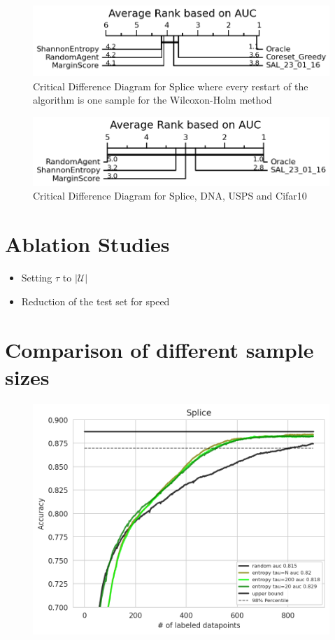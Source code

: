 \documentclass[]{article}
\begin{document}
\begin{figure}[H]
\centering
\includegraphics[width=0.8\linewidth]{img/eval_splice_embedded_cd}
\caption{Critical Difference Diagram for Splice where every restart of the algorithm is one sample for the Wilcoxon-Holm method}
\end{figure}
\begin{figure}[H]
\centering
\includegraphics[width=0.8\linewidth]{img/eval_macro}
\caption{Critical Difference Diagram for Splice, DNA, USPS and Cifar10}
\end{figure}



\section{Ablation Studies}
\begin{itemize}
	\item Setting $\tau$ to $|\mathcal{U}|$
	\item Reduction of the test set for speed
\end{itemize}



 

\appendix


\section{Comparison of different sample sizes}
\begin{figure}[H]
	\centering
	\includegraphics[width=0.7\linewidth]{img/tau_ablation.png}
\end{figure}
\end{document}
